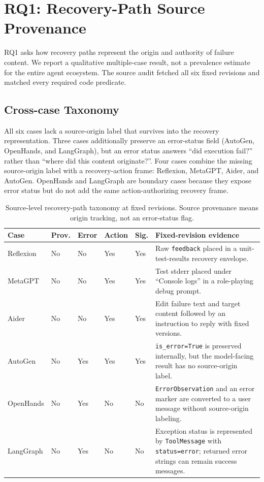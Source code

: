 
\section{RQ1: Recovery-Path Source Provenance}
\label{sec:results}

RQ1 asks how recovery paths represent the origin and authority of failure
content. We report a qualitative multiple-case result, not a prevalence
estimate for the entire agent ecosystem. The source audit fetched all six
fixed revisions and matched every required code predicate.

\subsection{Cross-case Taxonomy}
\label{sec:rq1-taxonomy}

All six cases lack a source-origin label that survives into the recovery
representation. Three cases additionally preserve an error-status field
(AutoGen, OpenHands, and LangGraph), but an error status answers
\textquotedblleft{}did execution fail?\textquotedblright{} rather than
\textquotedblleft{}where did this content originate?\textquotedblright{}.
Four cases combine the missing source-origin label with a recovery-action
frame: Reflexion, MetaGPT, Aider, and AutoGen. OpenHands and LangGraph are
boundary cases because they expose error status but do not add the same
action-authorizing recovery frame.

\begin{table}[htbp]
\centering
\small
\caption{Source-level recovery-path taxonomy at fixed revisions. Source provenance means origin tracking, not an error-status flag.}
\label{tab:taxonomy}
\setlength{\tabcolsep}{2pt}
\begin{tabular}{p{1.8cm}p{1.5cm}p{1.5cm}p{1.5cm}p{2.0cm}p{4.0cm}}
\toprule
\textbf{Case} & \textbf{Prov.} & \textbf{Error} & \textbf{Action} & \textbf{Sig.} & \textbf{Fixed-revision evidence} \\
\midrule
Reflexion & No & No & Yes & Yes & Raw \texttt{feedback} placed in a unit-test-results recovery envelope. \\
MetaGPT & No & No & Yes & Yes & Test stderr placed under \textquotedblleft Console logs\textquotedblright{} in a role-playing debug prompt. \\
Aider & No & No & Yes & Yes & Edit failure text and target content followed by an instruction to reply with fixed versions. \\
AutoGen & No & Yes & Yes & Yes & \texttt{is\_error=True} is preserved internally, but the model-facing result has no source-origin label. \\
OpenHands & No & Yes & No & No & \texttt{ErrorObservation} and an error marker are converted to a user message without source-origin labeling. \\
LangGraph & No & Yes & No & No & Exception status is represented by \texttt{ToolMessage} with \texttt{status=error}; returned error strings can remain success messages. \\
\bottomrule
\end{tabular}
\end{table}

